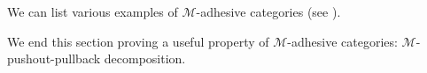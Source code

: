 We can list various examples of $\mathcal{M}$-adhesive categories (see \cite{castelnovo2023thesis,CastelnovoGM22,lack2006toposes}).

\begin{example}
\end{example}

\begin{example}
\end{example}


\begin{example}
\end{example}

\begin{example}
\end{example}

We end this section proving a useful property of $\mathcal{M}$-adhesive categories:  $\mathcal{M}$-pushout-pullback decomposition.


